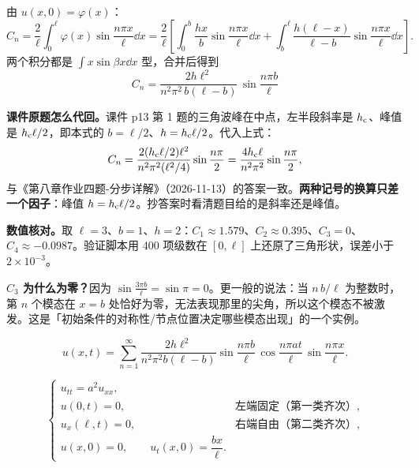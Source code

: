 \documentclass[11pt]{ctexart}
\begin{document}
由 $u(x,0)=\varphi(x)$：
\begin{equation}
  C_n=\frac{2}{\ell}\int_0^{\ell}\varphi(x)\sin\frac{n\pi x}{\ell}\dd x
  =\frac{2}{\ell}\left[\int_0^{b}\frac{hx}{b}\sin\frac{n\pi x}{\ell}\dd x
  +\int_b^{\ell}\frac{h(\ell-x)}{\ell-b}\sin\frac{n\pi x}{\ell}\dd x\right].
\end{equation}
两个积分都是 $\int x\sin\beta x\dd x$ 型，合并后得到
\begin{equation}
  \boxed{\;C_n=\frac{2h\ell^2}{n^2\pi^2\,b(\ell-b)}\,\sin\frac{n\pi b}{\ell}\;}
\end{equation}

\textbf{课件原题怎么代回。}课件 p13 第 1 题的三角波峰在中点，左半段斜率是 $h_{\rm c}$、峰值是 $h_{\rm c}\ell/2$，即本式的 $b=\ell/2$、$h=h_{\rm c}\ell/2$。代入上式：
\begin{equation}
  C_n=\frac{2(h_{\rm c}\ell/2)\ell^2}{n^2\pi^2(\ell^2/4)}\sin\frac{n\pi}{2}
  =\frac{4h_{\rm c}\ell}{n^2\pi^2}\sin\frac{n\pi}{2},
\end{equation}
与《第八章作业四题-分步详解》（2026-11-13）的答案一致。\textbf{两种记号的换算只差一个因子}：峰值 $h=h_{\rm c}\ell/2$。抄答案时看清题目给的是斜率还是峰值。

\textbf{数值核对。}取 $\ell=3$、$b=1$、$h=2$：$C_1\approx1.579$、$C_2\approx0.395$、$C_3=0$、$C_4\approx-0.0987$。验证脚本用 400 项级数在 $[0,\ell]$ 上还原了三角形状，误差小于 $2\times10^{-3}$。

\textbf{$C_3$ 为什么为零？}因为 $\sin\frac{3\pi b}{\ell}=\sin\pi=0$。更一般的说法：当 $n\,b/\ell$ 为整数时，第 $n$ 个模态在 $x=b$ 处恰好为零，无法表现那里的尖角，所以这个模态不被激发。这是「初始条件的对称性/节点位置决定哪些模态出现」的一个实例。

\begin{equation}
  u(x,t)=\sum_{n=1}^{\infty}\frac{2h\ell^2}{n^2\pi^2b(\ell-b)}\sin\frac{n\pi b}{\ell}\,
  \cos\frac{n\pi at}{\ell}\,\sin\frac{n\pi x}{\ell}.
\end{equation}


\begin{equation}
  \begin{cases}
    u_{tt}=a^2u_{xx},\\
    u(0,t)=0, & \text{左端固定（第一类齐次）},\\
    u_x(\ell,t)=0, & \text{右端自由（第二类齐次）},\\
    u(x,0)=0,\qquad u_t(x,0)=\dfrac{bx}{\ell}.
  \end{cases}
\end{equation}
\end{document}
